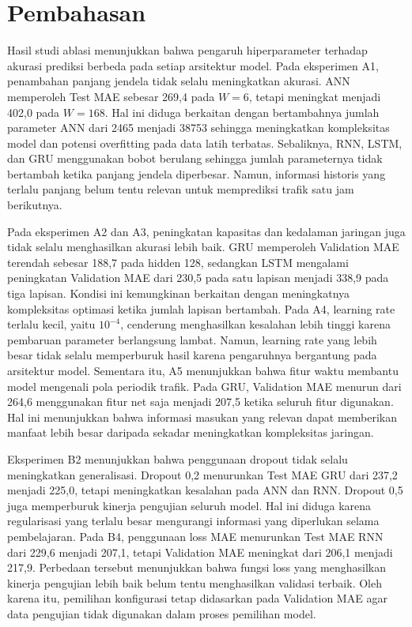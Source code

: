 \documentclass[conference,a4paper]{IEEEtran}
\begin{document}

\section{Pembahasan}
Hasil studi ablasi menunjukkan bahwa pengaruh hiperparameter terhadap akurasi prediksi berbeda pada setiap arsitektur model. Pada eksperimen A1, penambahan panjang jendela tidak selalu meningkatkan akurasi. ANN memperoleh Test MAE sebesar 269,4 pada $W=6$, tetapi meningkat menjadi 402,0 pada $W=168$. Hal ini diduga berkaitan dengan bertambahnya jumlah parameter ANN dari 2465 menjadi 38753 sehingga meningkatkan kompleksitas model dan potensi overfitting pada data latih terbatas. Sebaliknya, RNN, LSTM, dan GRU menggunakan bobot berulang sehingga jumlah parameternya tidak bertambah ketika panjang jendela diperbesar. Namun, informasi historis yang terlalu panjang belum tentu relevan untuk memprediksi trafik satu jam berikutnya.

Pada eksperimen A2 dan A3, peningkatan kapasitas dan kedalaman jaringan juga tidak selalu menghasilkan akurasi lebih baik. GRU memperoleh Validation MAE terendah sebesar 188,7 pada hidden 128, sedangkan LSTM mengalami peningkatan Validation MAE dari 230,5 pada satu lapisan menjadi 338,9 pada tiga lapisan. Kondisi ini kemungkinan berkaitan dengan meningkatnya kompleksitas optimasi ketika jumlah lapisan bertambah. Pada A4, learning rate terlalu kecil, yaitu $10^{-4}$, cenderung menghasilkan kesalahan lebih tinggi karena pembaruan parameter berlangsung lambat. Namun, learning rate yang lebih besar tidak selalu memperburuk hasil karena pengaruhnya bergantung pada arsitektur model. Sementara itu, A5 menunjukkan bahwa fitur waktu membantu model mengenali pola periodik trafik. Pada GRU, Validation MAE menurun dari 264,6 menggunakan fitur net saja menjadi 207,5 ketika seluruh fitur digunakan. Hal ini menunjukkan bahwa informasi masukan yang relevan dapat memberikan manfaat lebih besar daripada sekadar meningkatkan kompleksitas jaringan.

Eksperimen B2 menunjukkan bahwa penggunaan dropout tidak selalu meningkatkan generalisasi. Dropout 0,2 menurunkan Test MAE GRU dari 237,2 menjadi 225,0, tetapi meningkatkan kesalahan pada ANN dan RNN. Dropout 0,5 juga memperburuk kinerja pengujian seluruh model. Hal ini diduga karena regularisasi yang terlalu besar mengurangi informasi yang diperlukan selama pembelajaran. Pada B4, penggunaan loss MAE menurunkan Test MAE RNN dari 229,6 menjadi 207,1, tetapi Validation MAE meningkat dari 206,1 menjadi 217,9. Perbedaan tersebut menunjukkan bahwa fungsi loss yang menghasilkan kinerja pengujian lebih baik belum tentu menghasilkan validasi terbaik. Oleh karena itu, pemilihan konfigurasi tetap didasarkan pada Validation MAE agar data pengujian tidak digunakan dalam proses pemilihan model.
\end{document}
